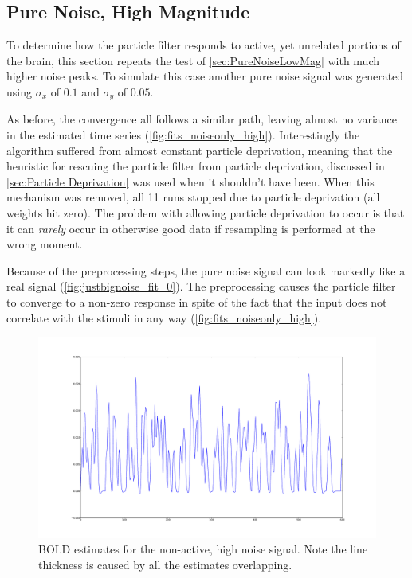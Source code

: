 \subsection{Pure Noise, High Magnitude}
\label{sec:PureNoiseHighMag}
To determine how the particle filter responds to active, yet unrelated
portions of the brain, this section repeats the test of \autoref{sec:PureNoiseLowMag}
with much higher noise peaks. To simulate this case another
pure noise signal was generated using $\sigma_x$ of $0.1$ and $\sigma_y$ of $0.05$.

As before, the convergence all follows a similar path, leaving almost no
variance in the estimated time series (\autoref{fig:fits_noiseonly_high}).
Interestingly the algorithm suffered from almost constant particle deprivation,
meaning that the heuristic
for rescuing the particle filter from particle deprivation, discussed in
\autoref{sec:Particle Deprivation} was used when it shouldn't have been.
 When this mechanism
was removed, all 11 runs stopped due to particle deprivation (all weights hit zero).
The problem with allowing particle deprivation to occur is that it can \emph{rarely}
occur in otherwise good data if resampling is performed at the wrong moment.

Because of the preprocessing steps, the pure noise signal can look markedly like a real
signal (\autoref{fig:justbignoise_fit_0}). The preprocessing causes the particle filter
to converge to a non-zero response in spite of the fact that the input does not correlate
with the stimuli in any way (\autoref{fig:fits_noiseonly_high}).

\begin{figure}[H]
\centering
\includegraphics[clip=true,trim=6cm 2cm 5cm 3cm,width=15cm]{images/fits_noiseonly_high}
\caption{\ac{BOLD} estimates for the non-active, high noise signal. Note the line thickness is caused
by all the estimates overlapping.}
\label{fig:fits_noiseonly_high}
\end{figure}

